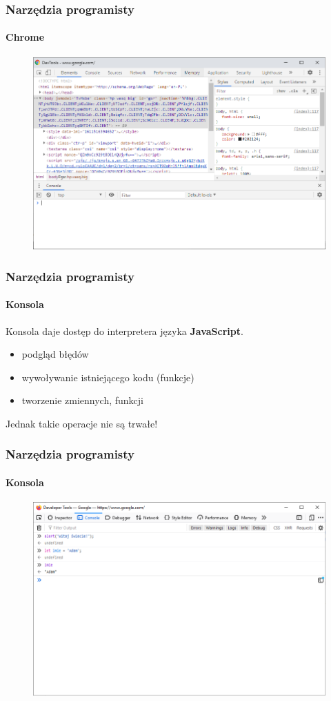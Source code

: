 \begin{frame}[fragile]
  \frametitle{Narzędzia programisty}
  \framesubtitle{Chrome}

  \begin{figure}
    \includegraphics[scale=0.45]{images/dev-tools-chrome}
  \end{figure}
\end{frame}


\begin{frame}[fragile]
  \frametitle{Narzędzia programisty}
  \framesubtitle{Konsola}

  Konsola daje dostęp do interpretera języka \textbf{JavaScript}.

  \begin{itemize}
      \item podgląd błędów
      \item wywoływanie istniejącego kodu (funkcje)
      \item tworzenie zmiennych, funkcji
  \end{itemize}

  Jednak takie operacje nie są trwałe!
\end{frame}


\begin{frame}[fragile]
  \frametitle{Narzędzia programisty}
  \framesubtitle{Konsola}

  \begin{figure}
    \includegraphics[scale=0.45]{images/dev-tools-console}
  \end{figure}
\end{frame}


